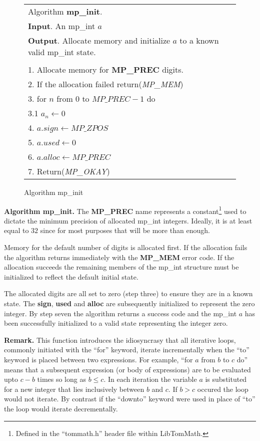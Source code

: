 \documentclass[b5paper]{book}
\begin{document}
\begin{figure}[here]
\begin{center}
\begin{tabular}{l}
\hline Algorithm \textbf{mp\_init}. \\
\textbf{Input}.   An mp\_int $a$ \\
\textbf{Output}.  Allocate memory and initialize $a$ to a known valid mp\_int state.  \\
\hline \\
1.  Allocate memory for \textbf{MP\_PREC} digits. \\
2.  If the allocation failed return(\textit{MP\_MEM}) \\
3.  for $n$ from $0$ to $MP\_PREC - 1$ do  \\
\hspace{3mm}3.1  $a_n \leftarrow 0$\\
4.  $a.sign \leftarrow MP\_ZPOS$\\
5.  $a.used \leftarrow 0$\\
6.  $a.alloc \leftarrow MP\_PREC$\\
7.  Return(\textit{MP\_OKAY})\\
\hline
\end{tabular}
\end{center}
\caption{Algorithm mp\_init}
\end{figure}

\textbf{Algorithm mp\_init.}
The \textbf{MP\_PREC} name represents a constant\footnote{Defined in the ``tommath.h'' header file within LibTomMath.} 
used to dictate the minimum precision of allocated mp\_int integers.  Ideally, it is at least equal to $32$ since for most
purposes that will be more than enough.

Memory for the default number of digits is allocated first.  If the allocation fails the algorithm returns immediately
with the \textbf{MP\_MEM} error code.  If the allocation succeeds the remaining members of the mp\_int structure
must be initialized to reflect the default initial state.

The allocated digits are all set to zero (step three) to ensure they are in a known state.  The \textbf{sign}, \textbf{used}
and \textbf{alloc} are subsequently initialized to represent the zero integer.  By step seven the algorithm returns a success 
code and the mp\_int $a$ has been successfully initialized to a valid state representing the integer zero.  

\textbf{Remark.}
This function introduces the idiosyncrasy that all iterative loops, commonly initiated with the ``for'' keyword, iterate incrementally
when the ``to'' keyword is placed between two expressions.  For example, ``for $a$ from $b$ to $c$ do'' means that
a subsequent expression (or body of expressions) are to be evaluated upto $c - b$ times so long as $b \le c$.  In each
iteration the variable $a$ is substituted for a new integer that lies inclusively between $b$ and $c$.  If $b > c$ occured
the loop would not iterate.  By contrast if the ``downto'' keyword were used in place of ``to'' the loop would iterate 
decrementally.
\end{document}
